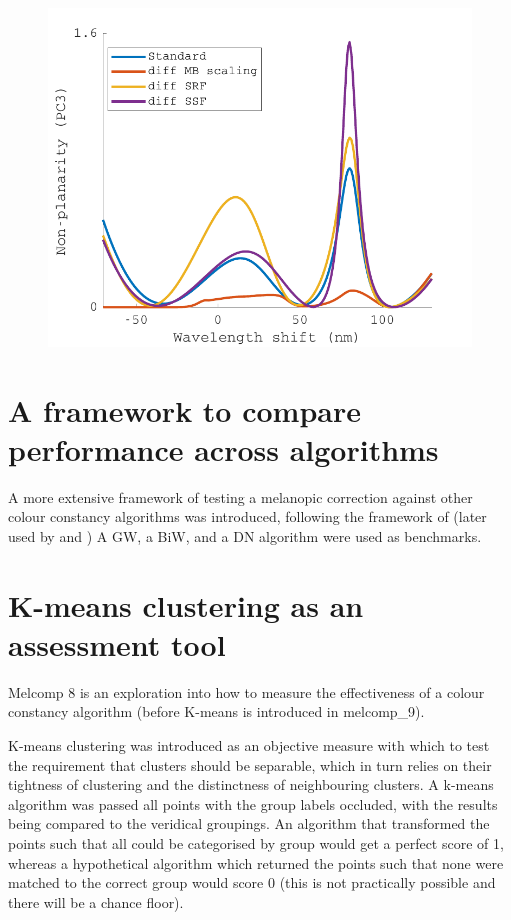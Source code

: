 \begin{figure}[htbp]
    \includegraphics[max width=\textwidth]{figs/comp/melcomp_6/PC3.pdf}
    \caption{}
    \label{fig:PC3}
\end{figure} 


\section{A framework to compare performance across algorithms}

A more extensive framework of testing a melanopic correction against other colour constancy algorithms was introduced, following the framework of \citet{barnard_comparison_2002} (later used by \citet{hordley_reevaluation_2006} and \citet{gijsenij_computational_2011}) A \gls{GW}, a \gls{BiW}, and a \gls{DN} algorithm were used as benchmarks.

\section{K-means clustering as an assessment tool}

Melcomp 8 is an exploration into how to measure the effectiveness of a colour constancy algorithm (before K-means is introduced in melcomp\_9).

K-means clustering was introduced as an objective measure with which to test the requirement that clusters should be separable, which in turn relies on their tightness of clustering and the distinctness of neighbouring clusters. A k-means algorithm was passed all points with the group labels occluded, with the results being compared to the veridical groupings. An algorithm that transformed the points such that all could be categorised by group would get a perfect score of 1, whereas a hypothetical algorithm which returned the points such that none were matched to the correct group would score 0 (this is not practically possible and there will be a chance floor).

